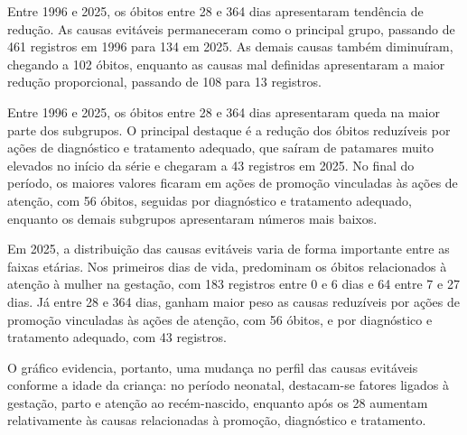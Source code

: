 
Entre 1996 e 2025, os óbitos entre 28 e 364 dias apresentaram tendência de redução. As causas evitáveis permaneceram como o principal grupo, passando de 461 registros em 1996 para 134 em 2025. As demais causas também diminuíram, chegando a 102 óbitos, enquanto as causas mal definidas apresentaram a maior redução proporcional, passando de 108 para 13 registros.


Entre 1996 e 2025, os óbitos entre 28 e 364 dias apresentaram queda na maior parte dos subgrupos. O principal destaque é a redução dos óbitos reduzíveis por ações de diagnóstico e tratamento adequado, que saíram de patamares muito elevados no início da série e chegaram a 43 registros em 2025. No final do período, os maiores valores ficaram em ações de promoção vinculadas às ações de atenção, com 56 óbitos, seguidas por diagnóstico e tratamento adequado, enquanto os demais subgrupos apresentaram números mais baixos.


Em 2025, a distribuição das causas evitáveis varia de forma importante entre as faixas etárias. Nos primeiros dias de vida, predominam os óbitos relacionados à atenção à mulher na gestação, com 183 registros entre 0 e 6 dias e 64 entre 7 e 27 dias. Já entre 28 e 364 dias, ganham maior peso as causas reduzíveis por ações de promoção vinculadas às ações de atenção, com 56 óbitos, e por diagnóstico e tratamento adequado, com 43 registros.

O gráfico evidencia, portanto, uma mudança no perfil das causas evitáveis conforme a idade da criança: no período neonatal, destacam-se fatores ligados à gestação, parto e atenção ao recém-nascido, enquanto após os 28 aumentam relativamente às causas relacionadas à promoção, diagnóstico e tratamento.


